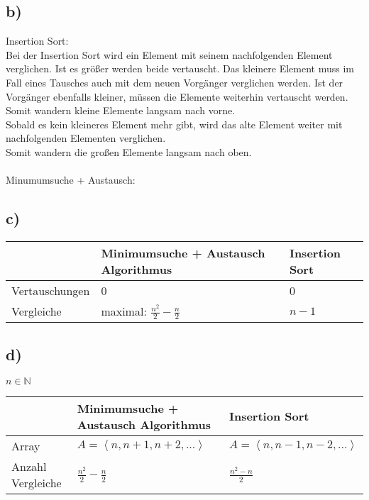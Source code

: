 \documentclass[a4paper]{scrartcl}
\begin{document}
\subsection*{b)}
Insertion Sort:\\
Bei der Insertion Sort wird ein Element mit seinem nachfolgenden Element verglichen. Ist es größer werden beide vertauscht. Das kleinere Element muss im Fall eines Tausches auch mit dem neuen Vorgänger verglichen werden. Ist der Vorgänger ebenfalls kleiner, müssen die Elemente weiterhin vertauscht werden.\\
Somit wandern kleine Elemente langsam nach vorne.\\
Sobald es kein kleineres Element mehr gibt, wird das alte Element weiter mit nachfolgenden Elementen verglichen.\\
Somit wandern die großen Elemente langsam nach oben.\\
\\
Minumumsuche + Austausch:\\


\subsection*{c)}

\begin{tabular}{l|l|l}
               & Minimumsuche + Austausch Algorithmus & Insertion Sort \\
\hline
Vertauschungen & 0                                    & 0               \\
\hline
Vergleiche     & maximal: $\frac{n^2}{2}-\frac{n}{2}$ & $n-1$            \\
                
\end{tabular}

\subsection*{d)}
$n \in \mathbb{N} $

\begin{tabular}{l|l|l}
               & Minimumsuche + Austausch Algorithmus & Insertion Sort \\
\hline
Array & $A = \left\langle n, n+1, n+2, ... \right\rangle$ &  $A = \left\langle n, n-1, n-2, ... \right\rangle$ \\
\hline
Anzahl Vergleiche     & $\frac{n^2}{2}-\frac{n}{2}$ & $\frac{n^2 - n}{2}$            \\
\end{tabular}
\end{document}
